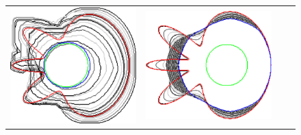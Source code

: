 \begin{figure}
\begin{tabular}{cccc}
\includegraphics[scale=0.18]{figures/chapter9/free-elastica/localsearch/flower/len_pen-0.01/radius-7/summary.pdf} & 
\includegraphics[scale=0.18]{figures/chapter9/free-elastica/flipflow/flower/len_pen-0.01/radius-7/summary.pdf} &

\end{tabular}
\end{figure}

